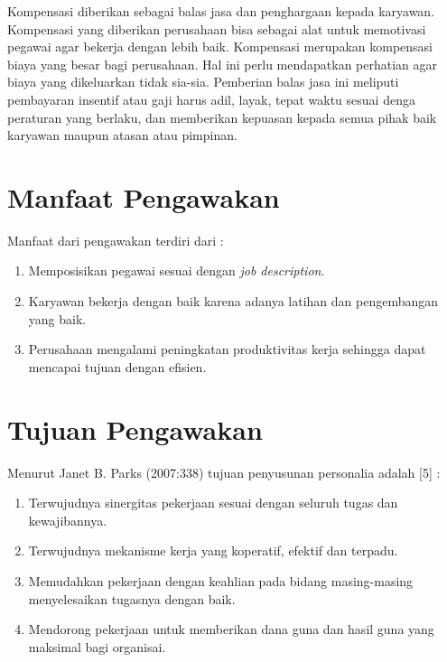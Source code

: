 Kompensasi diberikan sebagai balas jasa dan penghargaan kepada karyawan. Kompensasi yang diberikan perusahaan bisa sebagai alat untuk memotivasi pegawai agar bekerja dengan lebih baik. Kompensasi merupakan kompensasi biaya yang besar bagi perusahaan. Hal ini perlu mendapatkan perhatian agar biaya yang dikeluarkan tidak sia-sia. Pemberian balas jasa ini meliputi pembayaran insentif atau gaji harus adil, layak, tepat waktu sesuai denga peraturan yang berlaku, dan memberikan kepuasan kepada semua pihak baik karyawan maupun atasan atau pimpinan.

\section{Manfaat Pengawakan}

Manfaat dari pengawakan terdiri dari :

\begin{enumerate}

\item Memposisikan pegawai sesuai dengan \textit{job description}.

\item Karyawan bekerja dengan baik karena adanya latihan dan pengembangan yang baik.

\item Perusahaan mengalami peningkatan produktivitas kerja sehingga dapat mencapai tujuan dengan efisien.

\end{enumerate}

\section{Tujuan Pengawakan}

Menurut Janet B. Parks (2007:338) tujuan penyusunan personalia adalah [5] :

\begin{enumerate}

\item Terwujudnya sinergitas pekerjaan sesuai dengan seluruh tugas dan kewajibannya.

\item Terwujudnya mekanisme kerja yang koperatif, efektif dan terpadu.

\item Memudahkan pekerjaan dengan keahlian pada bidang masing-masing menyelesaikan tugasnya dengan baik.

\item Mendorong pekerjaan untuk memberikan dana guna dan hasil guna yang maksimal bagi organisai.

\end{enumerate}

